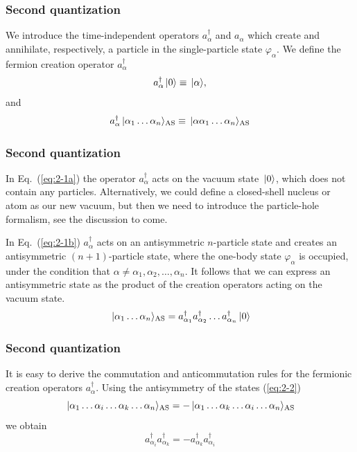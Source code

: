 \frame
{
  \frametitle{Second quantization}
\begin{small}
{\scriptsize
We introduce the time-independent  operators
$a_\alpha^\dagger$ and $a_\alpha$   which create and annihilate, respectively, a particle 
in the single-particle state 
$\varphi_\alpha$. 
We define the fermion creation operator
$a_\alpha^\dagger$ 
\begin{equation}
	a_\alpha^{\dagger}\ket{0} \equiv  \ket{\alpha}  \label{eq:2-1a},
\end{equation}
and
\begin{equation}
	a_\alpha^{\dagger}\ket{\alpha_1\dots \alpha_n}_{\mathrm{AS}} \equiv  \ket{\alpha\alpha_1\dots \alpha_n}_{\mathrm{AS}} \label{eq:2-1b}
\end{equation}
}
\end{small}
}

\frame
{
  \frametitle{Second quantization}
\begin{small}
{\scriptsize
In Eq.~(\ref{eq:2-1a}) 
the operator  $a_\alpha^\dagger$  acts on the vacuum state 
$\,|{0}\rangle$, which does not contain any particles. Alternatively, we could define  a closed-shell nucleus or atom as our new vacuum, but then
we need to introduce the particle-hole  formalism, see the discussion to come. 

In Eq.~(\ref{eq:2-1b}) $a_\alpha^\dagger$ acts on an antisymmetric $n$-particle state and 
creates an antisymmetric $(n+1)$-particle state, where the one-body state 
$\varphi_\alpha$ is occupied, under the condition that
$\alpha \ne \alpha_1, \alpha_2, \dots, \alpha_n$. 
It follows that we can express an antisymmetric state as the product of the creation
operators acting on the vacuum state.  
\begin{equation}
	\ket{\alpha_1\dots \alpha_n}_{\mathrm{AS}} = a_{\alpha_1}^\dagger a_{\alpha_2}^\dagger \dots a_{\alpha_n}^\dagger \ket{0} \label{eq:2-2}
\end{equation}
}
\end{small}
}

\frame
{
  \frametitle{Second quantization}
\begin{small}
{\scriptsize
It is easy to derive the commutation and anticommutation rules  for the fermionic creation operators 
$a_\alpha^\dagger$. Using the antisymmetry of the states 
(\ref{eq:2-2})
\begin{equation}
	\ket{\alpha_1\dots \alpha_i\dots \alpha_k\dots \alpha_n}_{\mathrm{AS}} = 
		- \ket{\alpha_1\dots \alpha_k\dots \alpha_i\dots \alpha_n}_{\mathrm{AS}} \label{eq:2-3a}
\end{equation}
we obtain
\begin{equation}
	 a_{\alpha_i}^\dagger  a_{\alpha_k}^\dagger = - a_{\alpha_k}^\dagger a_{\alpha_i}^\dagger \label{eq:2-3b}
\end{equation}
}
\end{small}
}

